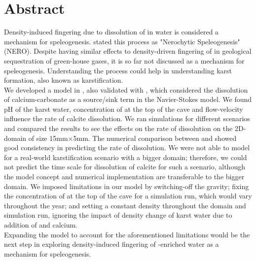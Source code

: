 \chapter*{Abstract}
\thispagestyle{empty}
Density-induced fingering due to dissolution of  in water is considered a mechanism for 
speleogenesis. \citet{Scherzer2017} stated this process as "Nerochytic Speleogenesis" (NERO). 
Despite having similar effects to density-driven fingering of  in geological sequestration 
of green-house gases, it is so far not discussed as a mechanism for speleogenesis. Understanding the 
process could help in understanding karst formation, also known as karstification.\\

We developed a model in \DuMuX, also validated with \MATLAB, which considered the dissolution of calcium-carbonate 
as a source/sink term in the Navier-Stokes model. We found pH of the karst water, concentration of  at the 
top of the cave and flow-velocity influence the rate of calcite dissolution. We ran simulations for different 
scenarios and compared the results to see the effects on the rate of dissolution on the 2D-domain of  size 15mm$\times$5mm. 
The numerical comparison between \DuMuX and \MATLAB showed good consistency in predicting the rate of dissolution. 
We were not able to model for a real-world karstification scenario with a bigger domain; therefore, we could not 
predict the time scale for dissolution of calcite for such a scenario, although the model concept and numerical 
implementation are transferable to the bigger domain. We imposed limitations in our model by switching-off the 
gravity; fixing the concentration of  at the top of the cave for a simulation run, which would vary throughout the year; and 
setting a constant density throughout the domain and simulation run, ignoring the impact of density change of karst 
water due to addition of  and calcium.\\

Expanding the model to account for the aforementioned limitations would be the next step in exploring density-induced 
fingering of -enriched water as a mechanism for speleogenesis.

\endinput